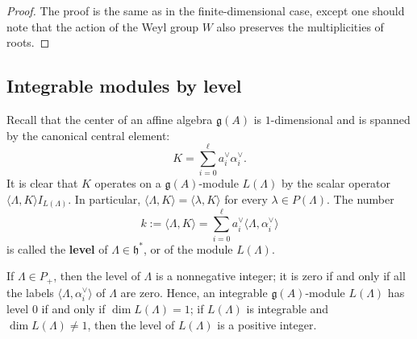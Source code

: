 \documentclass[12pt]{article}
\begin{document}
\begin{proof}
The proof is the same as in the finite-dimensional case, except one should note that the action of the Weyl group $W$ also preserves the multiplicities of roots.
\end{proof}

\subsection{Integrable modules by level}

Recall that the center of an affine algebra $\mathfrak{g}(A)$ is $1$-dimensional and is spanned by the canonical central element:
\[
K = \sum_{i=0}^{\ell} a_i^{\vee} \alpha_i^{\vee}.
\]
It is clear that $K$ operates on a $\mathfrak{g}(A)$-module $L(\Lambda)$ by the scalar operator $\langle \Lambda, K \rangle I_{L(\Lambda)}$. In particular, $\langle \Lambda, K \rangle = \langle \lambda, K \rangle$ for every $\lambda \in P(\Lambda)$. The number
\begin{equation}\label{eq:12.4.1}
    k := \langle \Lambda, K \rangle = \sum_{i=0}^{\ell} a_i^{\vee} \langle \Lambda, \alpha_i^{\vee} \rangle
\end{equation}
is called the \textbf{level} of $\Lambda \in \mathfrak{h}^*$, or of the module $L(\Lambda)$.

If $\Lambda \in P_+$, then the level of $\Lambda$ is a nonnegative integer; it is zero if and only if all the labels $\langle \Lambda, \alpha_i^{\vee} \rangle$ of $\Lambda$ are zero. Hence, an integrable $\mathfrak{g}(A)$-module $L(\Lambda)$ has level $0$ if and only if $\dim L(\Lambda) = 1$; if $L(\Lambda)$ is integrable and $\dim L(\Lambda) \ne 1$, then the level of $L(\Lambda)$ is a positive integer.
\end{document}
